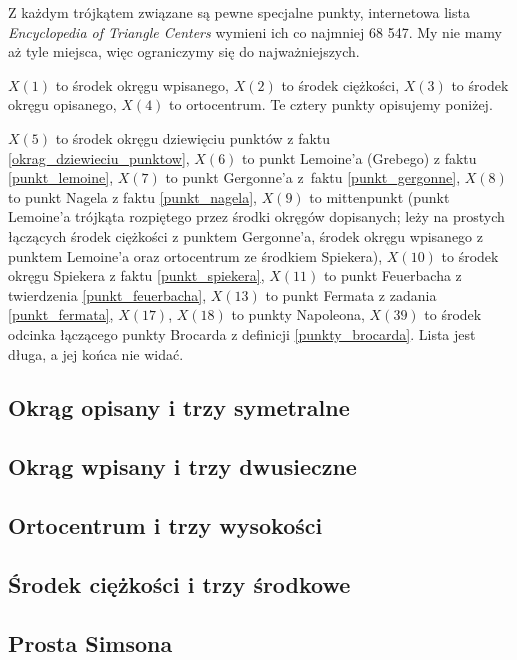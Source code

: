 Z każdym trójkątem związane są pewne specjalne punkty, internetowa lista \emph{Encyclopedia of Triangle Centers} wymieni ich co najmniej 68 547.
My nie mamy aż tyle miejsca, więc ograniczymy się do najważniejszych.

$X(1)$ to środek okręgu wpisanego, 
$X(2)$ to środek ciężkości,
$X(3)$ to środek okręgu opisanego,
$X(4)$ to ortocentrum.
Te cztery punkty opisujemy poniżej.

$X(5)$ to środek okręgu dziewięciu punktów z faktu \ref{okrag_dziewieciu_punktow},
$X(6)$ to punkt Lemoine'a (Grebego) z faktu \ref{punkt_lemoine},
$X(7)$ to punkt Gergonne'a z~faktu \ref{punkt_gergonne},
$X(8)$ to punkt Nagela z faktu \ref{punkt_nagela}, 
$X(9)$ to mittenpunkt (punkt Lemoine'a trójkąta rozpiętego przez środki okręgów dopisanych; leży na prostych łączących środek ciężkości z punktem Gergonne'a, środek okręgu wpisanego z punktem Lemoine'a oraz ortocentrum ze środkiem Spiekera), %
$X(10)$ to środek okręgu Spiekera z faktu \ref{punkt_spiekera},
$X(11)$ to punkt Feuerbacha z twierdzenia \ref{punkt_feuerbacha},
$X(13)$ to punkt Fermata z zadania \ref{punkt_fermata},
$X(17)$, $X(18)$ to punkty Napoleona,
$X(39)$ to środek odcinka łączącego punkty Brocarda z definicji \ref{punkty_brocarda}.
Lista jest długa, a jej końca nie widać.

\subsection{Okrąg opisany i trzy symetralne}


\subsection{Okrąg wpisany i trzy dwusieczne}


\subsection{Ortocentrum i trzy wysokości}


\subsection{Środek ciężkości i trzy środkowe}


\subsection{Prosta Simsona}



%